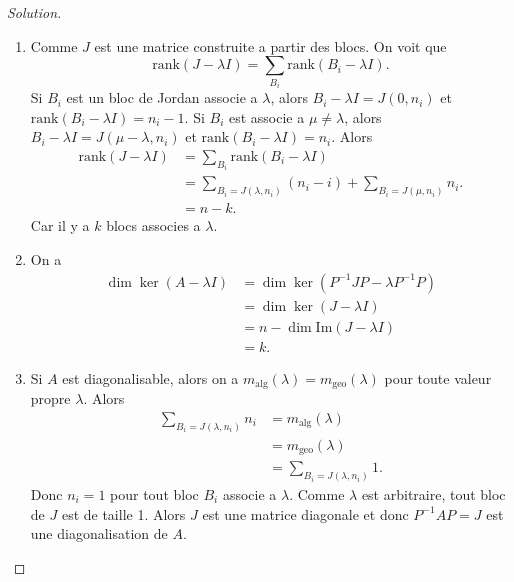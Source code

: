 \documentclass[a4paper,12pt,french]{report}
\theoremstyle{plain}
\theoremstyle{definition}
\begin{document}
\begin{proof}[Solution]
\begin{enumerate}
\item Comme $J$ est une matrice construite a partir des blocs. On voit que
$$
\mathrm{rank}(J-\lambda I)=\sum _{B_{i}}\mathrm{rank}(B_{i}-\lambda I).
$$
Si $B_{i}$ est un bloc de Jordan associe a $\lambda$, alors $B_{i}-\lambda I=J(0,n_{i})$ et $\mathrm{rank}(B_{i}-\lambda I)=n_{i}-1$. Si $B_{i}$ est associe a $\mu\neq\lambda$, alors $B_{i}-\lambda I=J(\mu -\lambda,n_{i})$ et $\mathrm{rank}(B_{i}-\lambda I)=n_{i}$. Alors
\begin{align*}
\mathrm{rank}(J-\lambda I) & =\sum _{B_{i}}\mathrm{rank}(B_{i}-\lambda I) \\
 & =\sum _{B_{i}=J(\lambda,n_{i})}(n_{i}-i)+\sum _{B_{i}=J(\mu,n_{i})}n_{i}. \\
 & =n-k.
\end{align*}
Car il y a $k$ blocs associes a $\lambda$.
\item On a
\begin{align*}
\dim\ker(A-\lambda I ) & =\dim\ker(P^{-1}JP-\lambda P^{-1}P ) \\
 & =\dim\ker(J-\lambda I) \\
 & =n-\dim\mathrm{Im}(J-\lambda I) \\
 & =k.
\end{align*}
\item Si $A$ est diagonalisable, alors on a $m_{\mathrm{alg}}(\lambda)=m_{\mathrm{geo}}(\lambda)$ pour toute valeur propre $\lambda$. Alors
\begin{align*}
\sum _{B_{i}=J(\lambda,n_{i})}n_{i} & =m_{\mathrm{alg}}(\lambda) \\
 & =m_{\mathrm{geo}}(\lambda) \\
 & =\sum _{B_{i}=J(\lambda,n_{i})}1.
\end{align*}
Donc $n_{i}=1$ pour tout bloc $B_{i}$ associe a $\lambda$. Comme $\lambda$ est arbitraire, tout bloc de $J$ est de taille 1. Alors $J$ est une matrice diagonale et donc $P^{-1}AP=J$ est une diagonalisation de $A$.
\end{enumerate}
\end{proof}
\end{document}
